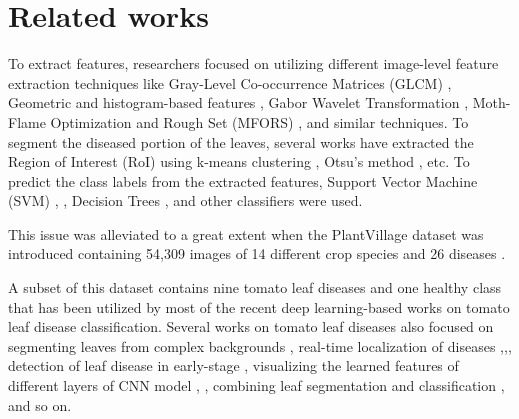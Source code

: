 \documentclass[a4paper,10pt]{article}
\begin{document}
\section{Related works}
To extract features, researchers
focused on utilizing different image-level feature extraction techniques like Gray-Level Co-occurrence Matrices (GLCM) \cite{27}, Geometric and histogram-based features \cite{28}, Gabor Wavelet Transformation \cite{29}, Moth-Flame Optimization and Rough Set (MFORS) \cite{30}, and similar techniques. To segment the diseased portion of the leaves, several works have extracted the Region of Interest (RoI) using k-means clustering \cite{28}, Otsu’s method \cite{31}, etc. To predict the class labels from the extracted features, Support Vector Machine (SVM) \cite{27}, \cite{29}, Decision Trees \cite{31}, and other classifiers
were used.

This issue was alleviated to a
great extent when the PlantVillage dataset was introduced containing 54,309 images of 14 different crop species and 26 diseases \cite{17}. 

A subset of this dataset contains nine tomato
leaf diseases and one healthy class that has been utilized by most of the recent deep learning-based works on tomato leaf disease classification. Several works on tomato leaf diseases also focused on segmenting leaves from complex backgrounds \cite{32}, real-time localization of diseases \cite{33},\cite{34},\cite{35},
detection of leaf disease in early-stage \cite{36}, visualizing the
learned features of different layers of CNN model \cite{37} , \cite{38},
combining leaf segmentation and classification \cite{39}, and so on.
\end{document}
